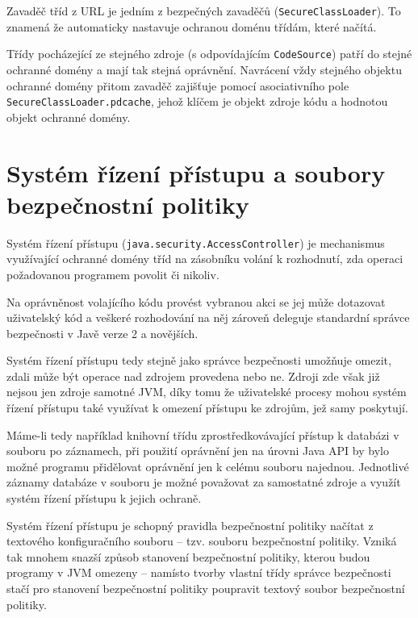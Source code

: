Zavaděč tříd z URL je jedním z bezpečných zavaděčů ({\tt SecureClassLoader}). To znamená že automaticky nastavuje ochranou doménu třídám, které načítá.

Třídy pocházející ze stejného zdroje (s odpovídajícím {\tt CodeSource}) patří do stejné ochranné domény a mají tak stejná oprávnění. Navrácení vždy stejného objektu ochranné domény přitom zavaděč zajišťuje pomocí asociativního pole {\tt SecureClassLoader.pdcache}, jehož klíčem je objekt zdroje kódu a hodnotou objekt ochranné domény. \cite{sourceSecureClassLoader}

\section{Systém řízení přístupu a soubory bezpečnostní politiky}

Systém řízení přístupu ({\tt java.security.AccessController}) je mechanismus využívající ochranné domény tříd na zásobníku volání k rozhodnutí, zda operaci požadovanou programem povolit či nikoliv. 

Na oprávněnost volajícího kódu provést vybranou akci se jej může dotazovat uživatelský kód a veškeré rozhodování na něj zároveň deleguje standardní správce bezpečnosti v Javě verze 2 a novějších. \cite[5]{oaks}

Systém řízení přístupu tedy stejně jako správce bezpečnosti umožňuje omezit, zdali může být operace nad zdrojem provedena nebo ne. Zdroji zde však již nejsou jen zdroje samotné JVM, díky tomu že uživatelské procesy mohou systém řízení přístupu také využívat k omezení přístupu ke zdrojům, jež samy poskytují. \cite[5]{oaks}

Máme-li tedy například knihovní třídu zprostředkovávající přístup k databázi v souboru po záznamech, při použití oprávnění jen na úrovni Java API by bylo možné programu přidělovat oprávnění jen k celému souboru najednou. Jednotlivé záznamy databáze v souboru je možné považovat za samostatné zdroje a využít systém řízení přístupu k jejich ochraně.

Systém řízení přístupu je schopný pravidla bezpečnostní politiky načítat z textového konfiguračního souboru -- tzv. souboru bezpečnostní politiky. Vzniká tak mnohem snazší způsob stanovení bezpečnostní politiky, kterou budou programy v JVM omezeny -- namísto tvorby vlastní třídy správce bezpečnosti stačí pro stanovení bezpečnostní politiky poupravit textový soubor bezpečnostní politiky. \cite[5]{oaks}

